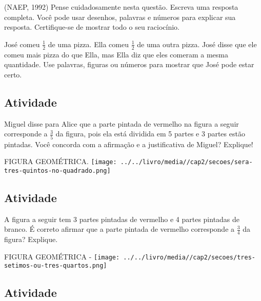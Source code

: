 \documentclass[a4,12pt]{book}
\begin{document}
(NAEP, 1992) Pense cuidadosamente nesta questão. Escreva uma resposta completa. Você pode usar desenhos, palavras e números para explicar sua resposta. Certifique-se de mostrar todo o seu raciocínio.

José comeu $\frac{1}{2}$ de uma pizza. Ella comeu $\frac{1}{2}$ de uma outra pizza. José disse que ele comeu mais pizza do que Ella, mas Ella diz que eles comeram a mesma quantidade. Use palavras, figuras ou números para mostrar que José pode estar certo.






\subsection{Atividade}







Miguel disse para Alice que a parte pintada de vermelho na figura a seguir corresponde a $\frac{3}{5}$ da figura, pois ela está dividida em 5 partes e 3 partes estão pintadas. Você concorda com a afirmação e a justificativa de Miguel? Explique!
\begin{imagem*}[breakable]{}{}   FIGURA GEOMÉTRICA.  
    \texttt{[image: ../../livro/media//cap2/secoes/sera-tres-quintos-no-quadrado.png]}  
\end{imagem*}





\subsection{Atividade}







A figura a seguir tem 3 partes pintadas de vermelho e 4 partes pintadas de branco. É correto afirmar que a parte pintada de vermelho corresponde a $\frac{3}{4}$ da figura? Explique.
\begin{imagem*}[breakable]{}{}   FIGURA GEOMÉTRICA -   
    \texttt{[image: ../../livro/media//cap2/secoes/tres-setimos-ou-tres-quartos.png]}  
\end{imagem*}






\subsection{Atividade}
\end{document}

